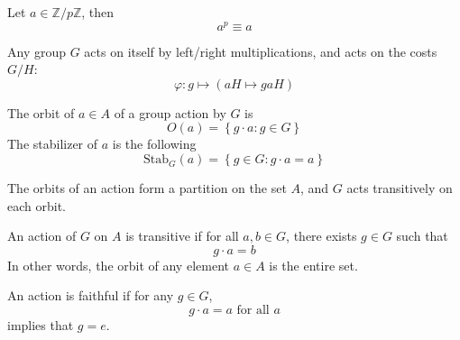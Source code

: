 \documentclass[openany]{book}
\newcommand{\Z}{\mathbb{Z}}
\begin{document}
\begin{prop}
    Let $a\in\Z/p\Z$, then 
    \begin{equation*}
        a^p\equiv a
    \end{equation*}
\end{prop}


\begin{prop}
    Any group $G$ acts on itself by left/right multiplications, and acts on the costs $G/H$:
    \begin{equation*}
        \varphi: g\mapsto \left(aH\mapsto gaH\right)
    \end{equation*}
\end{prop}


\begin{defn}[orbit]
    The orbit of $a\in A$ of a group action by $G$ is 
    \begin{equation*}
        O(a)=\left\{g\cdot a: g\in G\right\}
    \end{equation*}
    The stabilizer of $a$ is the following 
    \begin{equation*}
        \text{Stab}_G(a)=\left\{g\in G: g\cdot a=a\right\}
    \end{equation*}
\end{defn}

\begin{prop}
    The orbits of an action form a partition on the set $A$, and $G$ acts transitively on each orbit.
\end{prop}

\begin{defn}




    An action of $G$ on $A$ is transitive if for all $a,b\in G$, there exists $g\in G$ such that 
    \begin{equation*}
        g\cdot a=b
    \end{equation*}
    In other words, the orbit of any element $a\in A$ is the entire set.

    An action is faithful if for any $g\in G$, 
    \begin{equation*}
        g\cdot a=a \text{ for all } a
    \end{equation*}
    implies that $g=e$.
\end{defn}
\end{document}
